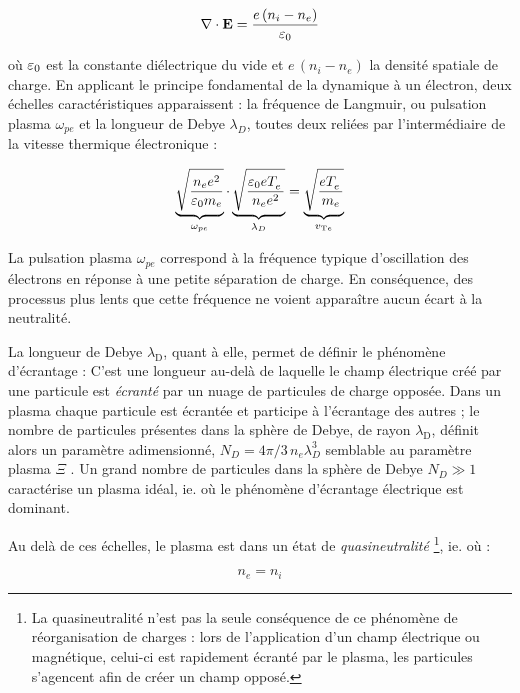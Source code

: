 \begin{refsection}
\begin{align}
\label{1-Max-Poisson}
\nabla\cdot\mathbf{E}=\frac{e\,(n_{i}-n_{e})}{\varepsilon{_{0}}}
\end{align}

où $\varepsilon{_{0}}$ est la constante diélectrique du
vide et $e\,(n_{i}-n_{e})$ la densité spatiale de charge. 
En applicant le principe fondamental de la dynamique à un électron, deux
échelles caractéristiques apparaissent : la fréquence de Langmuir, ou pulsation
plasma $\omega_{pe}$ et la longueur de Debye $\lambda_D$, toutes deux reliées
par l'intermédiaire de la vitesse thermique électronique :

\begin{equation}
\underbrace{\sqrt{\frac{n_e
e^{{2}}}{\varepsilon{_{0}}
m_{e}}}}_{\omega_{pe}}\cdot\underbrace{\sqrt{\frac{\varepsilon{_{0}}
eT_{e}^{{\phantom{1}}}}{n_e e^{{2}}}}}_{\lambda_D}
=\underbrace{\sqrt{\frac{eT_{e}^{{\phantom{1}}}}{m_{e}}}}_{v_{\text{T}{e}}}
\end{equation}

La pulsation plasma $\omega_{pe}$ correspond à la fréquence typique
d'oscillation des électrons en réponse à une petite séparation de charge. En
conséquence, des processus plus lents que cette fréquence ne voient
apparaître aucun écart à la neutralité.

La longueur de Debye $\lambda_\text{D}$, quant à elle, permet de définir le
phénomène d'écrantage :
C'est une longueur au-delà de laquelle le champ électrique créé par une particule est \emph{écranté} par 
un nuage de particules de charge opposée. Dans un plasma chaque particule est écrantée et participe
à l'écrantage des autres ; le nombre de particules présentes
dans la sphère de Debye, de rayon $\lambda_\text{D}$, définit alors un paramètre
adimensionné, $N_D=4\pi/3\,n_e\lambda_D^3$ semblable au paramètre plasma $\Xi$
. Un grand nombre de particules dans la sphère de Debye
$N_D\gg1$ caractérise un plasma idéal, ie. où le
phénomène d'écrantage électrique est dominant.

Au delà de ces échelles, le plasma est dans un état de \emph{quasineutralité}
\footnote{La quasineutralité n'est pas la seule conséquence de ce phénomène de
réorganisation de charges : lors de l'application d'un champ électrique ou magnétique, celui-ci est rapidement
écranté par le plasma, les particules s'agencent afin de créer un champ
opposé.}, ie. où :

\begin{equation}
n_e=n_i
\label{quasineutralité}
\end{equation}


\end{refsection}
